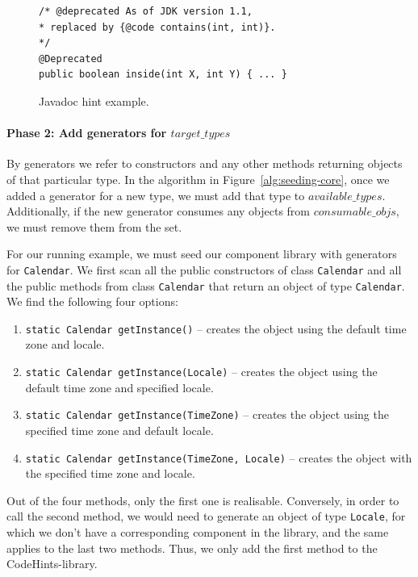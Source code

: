 \documentclass[sigconf]{acmart}
\newcommand{\consumableobjs}{\mbox{$\mathit{consumable\_objs}$}\xspace}
\newcommand{\availabletypes}{\mbox{$\mathit{available\_types}$}\xspace}
\newcommand{\targettypes}{\mbox{$\mathit{target\_types}$}\xspace}
\begin{document}
\begin{figure}
\begin{lstlisting}[mathescape=true,showstringspaces=false]
/* @deprecated As of JDK version 1.1,
* replaced by {@code contains(int, int)}.
*/
@Deprecated
public boolean inside(int X, int Y) { ... }
\end{lstlisting}
\caption{Javadoc hint example.}
\label{ex:javadoc-hint}
\end{figure}




\paragraph{{\bf Phase 2: Add generators for \targettypes}}

By generators we refer to constructors and any other methods returning
objects of that particular type.  In the algorithm in
Figure~\ref{alg:seeding-core}, once we added a generator for a new type, we
must add that type to \availabletypes.  Additionally, if the new generator
consumes any objects from \consumableobjs, we must remove them from the set.

For our running example, we must seed our component library with generators
for \lstinline[breaklines=true]{Calendar}.
%
We first scan all the public constructors of class
\lstinline[breaklines=true]{Calendar} and all the public methods from class
\lstinline[breaklines=true]{Calendar} that return an object of type
\lstinline[breaklines=true]{Calendar}.  We find the following four options:
%
\begin{enumerate}
  \item \lstinline[breaklines=true]{static Calendar getInstance()} -- creates the object using the default time zone and locale.
  \item \lstinline[breaklines=true]{static Calendar getInstance(Locale)} -- creates the object using the default time zone and specified locale.
  \item \lstinline[breaklines=true]{static Calendar getInstance(TimeZone)} -- creates the object using the specified time zone and default locale.
  \item \lstinline[breaklines=true]{static Calendar getInstance(TimeZone, Locale)} -- creates the object with the specified time zone and locale.
\end{enumerate}

Out of the four methods, only the first one is realisable.  Conversely, in
order to call the second method, we would need to generate an object of type
\lstinline[breaklines=true]{Locale}, for which we don't have a corresponding
component in the library, and the same applies to the last two methods.
Thus, we only add the first method to the CodeHints-library.
\end{document}
